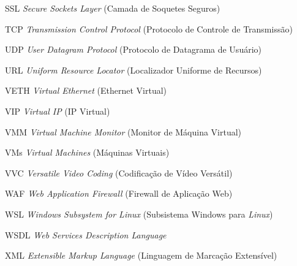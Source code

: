 \begin{siglas}
\item[SSL] \textit{Secure Sockets Layer} (Camada de Soquetes Seguros)
\item[TCP] \textit{Transmission Control Protocol} (Protocolo de Controle de Transmissão)
\item[UDP] \textit{User Datagram Protocol} (Protocolo de Datagrama de Usuário)
\item[URL] \textit{Uniform Resource Locator} (Localizador Uniforme de Recursos)
\item[VETH] \textit{Virtual Ethernet} (Ethernet Virtual)
\item[VIP] \textit{Virtual IP} (IP Virtual)
\item[VMM] \textit{Virtual Machine Monitor} (Monitor de Máquina Virtual)
\item[VMs] \textit{Virtual Machines} (Máquinas Virtuais)
\item[VVC] \textit{Versatile Video Coding} (Codificação de Vídeo Versátil)
\item[WAF] \textit{Web Application Firewall} (Firewall de Aplicação Web)
\item[WSL] \textit{Windows Subsystem for Linux} (Subsistema Windows para \textit{Linux})
\item[WSDL] \textit{Web Services Description Language}
\item[XML] \textit{Extensible Markup Language} (Linguagem de Marcação Extensível)
\end{siglas}




